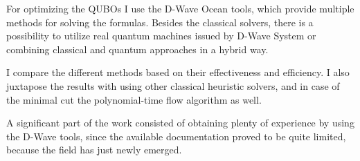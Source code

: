 For optimizing the QUBOs I use the D-Wave Ocean tools, which provide multiple methods for solving the formulas. Besides the classical solvers, there is a possibility to utilize real quantum machines issued by D-Wave System or combining classical and quantum approaches in a hybrid way. 

I compare the different methods based on their effectiveness and efficiency. I also juxtapose the results with using other classical heuristic solvers, and in case of the minimal cut the polynomial-time flow algorithm as well.

A significant part of the work consisted of obtaining plenty of experience by using the D-Wave tools, since the available documentation proved to be quite limited, because the field has just newly emerged.


\vfill
\selectthesislanguage

\setcounter{romanPage}{\value{page}}
